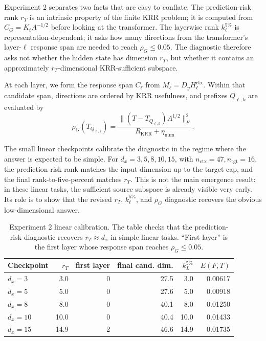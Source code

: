 \documentclass[11pt]{article}
\begin{document}
Experiment 2 separates two facts that are easy to conflate. The prediction-risk rank \(r_T\) is an
intrinsic property of the finite KRR problem; it is computed from \(C_G=K_tA^{-1/2}\) before looking
at the transformer. The layerwise rank \(k_\ell^{5\%}\) is representation-dependent; it asks how
many directions from the transformer's layer-\(\ell\) response span are needed to reach
\(\rho_G\le0.05\). The diagnostic therefore asks not whether the hidden state has dimension
\(r_T\), but whether it contains an approximately \(r_T\)-dimensional KRR-sufficient subspace.

At each layer, we form the response span \(C_\ell\) from \(M_\ell=D_yH_\ell^{\mathrm{ctx}}\). Within
that candidate span, directions are ordered by KRR usefulness, and prefixes \(Q_{\ell,k}\) are
evaluated by
\[
\rho_G(T_{Q_{\ell,k}})
=
\frac{\|(T-T_{Q_{\ell,k}})A^{1/2}\|_F^2}{R_{\mathrm{KRR}}+\eta_{\mathrm{num}}}.
\]

The small linear checkpoints calibrate the diagnostic in the regime where the answer is expected to
be simple. For \(d_x=3,5,8,10,15\), with \(n_{\mathrm{ctx}}=47,n_{\mathrm{tgt}}=16\), the
prediction-risk rank matches the input dimension up to the target cap, and the final
rank-to-five-percent matches \(r_T\). This is not the main emergence result: in these linear tasks,
the sufficient source subspace is already visible very early. Its role is to show that the revised
\(r_T\), \(k_\ell^{5\%}\), and \(\rho_G\) diagnostic recovers the obvious low-dimensional answer.

\begin{table}[htbp]
\centering
\caption{Experiment 2 linear calibration. The table checks that the prediction-risk diagnostic
recovers \(r_T\approx d_x\) in simple linear tasks. ``First layer'' is the first layer whose response
span reaches \(\rho_G\le0.05\).}
\scriptsize
\setlength{\tabcolsep}{4pt}
\renewcommand{\arraystretch}{0.9}
\begin{tabular}{lrrrrr}
\toprule
Checkpoint & \(r_T\) & first layer & final cand. dim. & \(k_L^{5\%}\) & \(E(F,T)\)\\
\midrule
\(d_x=3\)  & 3.0  & 0 & 27.5 & 3.0  & 0.00617\\
\(d_x=5\)  & 5.0  & 0 & 27.6 & 5.0  & 0.00918\\
\(d_x=8\)  & 8.0  & 0 & 40.1 & 8.0  & 0.01250\\
\(d_x=10\) & 10.0 & 0 & 40.4 & 10.0 & 0.01433\\
\(d_x=15\) & 14.9 & 2 & 46.6 & 14.9 & 0.01735\\
\bottomrule
\end{tabular}
\renewcommand{\arraystretch}{1}
\end{table}
\end{document}
